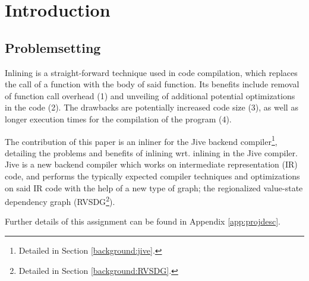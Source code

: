 
\section{Introduction}

\subsection{Problemsetting}


Inlining is a straight-forward technique used in code compilation, which
replaces the call of a function with the body of said function. Its benefits
include removal of function call overhead (1) and unveiling of additional
potential optimizations in the code (2). The drawbacks are potentially increased
code size (3), as well as longer execution times for the compilation of the
program (4).

The contribution of this paper is an inliner for the Jive backend
compiler\footnote{Detailed in Section \ref{background:jive}.}, detailing the
problems and benefits of inlining wrt. inlining in the Jive compiler. Jive is a
new backend compiler which works on intermediate representation (IR) code, and
performs the typically expected compiler techniques and optimizations on said IR
code with the help of a new type of graph; the regionalized value-state
dependency graph (RVSDG\footnote{Detailed in Section \ref{background:RVSDG}.}).

Further details of this assignment can be found in Appendix
\ref{app:projdesc}.
